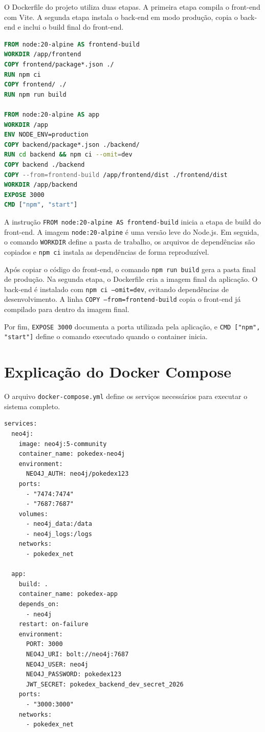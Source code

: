 \documentclass[12pt,a4paper]{article}
\begin{document}
O Dockerfile do projeto utiliza duas etapas. A primeira etapa compila o front-end com Vite. A segunda etapa instala o back-end em modo produção, copia o back-end e inclui o build final do front-end.

\begin{lstlisting}[language=Dockerfile]
FROM node:20-alpine AS frontend-build
WORKDIR /app/frontend
COPY frontend/package*.json ./
RUN npm ci
COPY frontend/ ./
RUN npm run build

FROM node:20-alpine AS app
WORKDIR /app
ENV NODE_ENV=production
COPY backend/package*.json ./backend/
RUN cd backend && npm ci --omit=dev
COPY backend ./backend
COPY --from=frontend-build /app/frontend/dist ./frontend/dist
WORKDIR /app/backend
EXPOSE 3000
CMD ["npm", "start"]
\end{lstlisting}

A instrução \texttt{FROM node:20-alpine AS frontend-build} inicia a etapa de build do front-end. A imagem \texttt{node:20-alpine} é uma versão leve do Node.js. Em seguida, o comando \texttt{WORKDIR} define a pasta de trabalho, os arquivos de dependências são copiados e \texttt{npm ci} instala as dependências de forma reproduzível.

Após copiar o código do front-end, o comando \texttt{npm run build} gera a pasta final de produção. Na segunda etapa, o Dockerfile cria a imagem final da aplicação. O back-end é instalado com \texttt{npm ci --omit=dev}, evitando dependências de desenvolvimento. A linha \texttt{COPY --from=frontend-build} copia o front-end já compilado para dentro da imagem final.

Por fim, \texttt{EXPOSE 3000} documenta a porta utilizada pela aplicação, e \texttt{CMD ["npm", "start"]} define o comando executado quando o container inicia.

\section{Explicação do Docker Compose}

O arquivo \texttt{docker-compose.yml} define os serviços necessários para executar o sistema completo.

\begin{lstlisting}
services:
  neo4j:
    image: neo4j:5-community
    container_name: pokedex-neo4j
    environment:
      NEO4J_AUTH: neo4j/pokedex123
    ports:
      - "7474:7474"
      - "7687:7687"
    volumes:
      - neo4j_data:/data
      - neo4j_logs:/logs
    networks:
      - pokedex_net

  app:
    build: .
    container_name: pokedex-app
    depends_on:
      - neo4j
    restart: on-failure
    environment:
      PORT: 3000
      NEO4J_URI: bolt://neo4j:7687
      NEO4J_USER: neo4j
      NEO4J_PASSWORD: pokedex123
      JWT_SECRET: pokedex_backend_dev_secret_2026
    ports:
      - "3000:3000"
    networks:
      - pokedex_net
\end{lstlisting}
\end{document}
